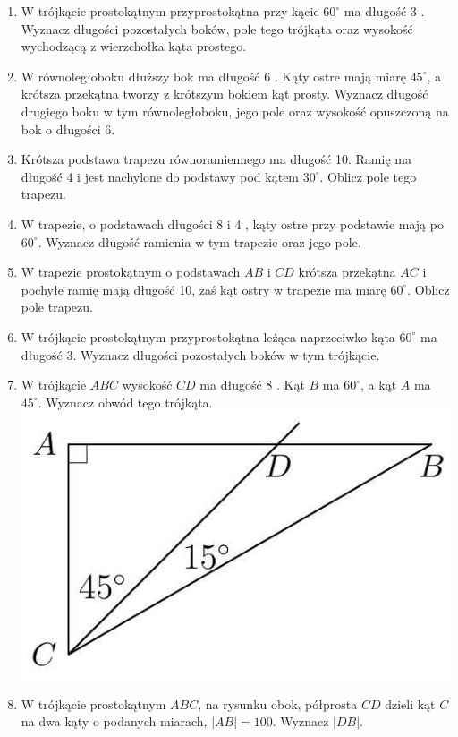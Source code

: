 \documentclass[10pt]{article}
\begin{document}
\begin{enumerate}
  \item W trójkącie prostokątnym przyprostokątna przy kącie \(60^{\circ}\) ma długość 3 . Wyznacz długości pozostałych boków, pole tego trójkąta oraz wysokość wychodzącą z wierzchołka kąta prostego.
  \item W równoległoboku dłuższy bok ma długość 6 . Kąty ostre mają miarę \(45^{\circ}\), a krótsza przekątna tworzy z krótszym bokiem kąt prosty. Wyznacz długość drugiego boku w tym równoległoboku, jego pole oraz wysokość opuszczoną na bok o długości 6.
  \item Krótsza podstawa trapezu równoramiennego ma długość 10. Ramię ma długość 4 i jest nachylone do podstawy pod kątem \(30^{\circ}\). Oblicz pole tego trapezu.
  \item W trapezie, o podstawach długości 8 i 4 , kąty ostre przy podstawie mają po \(60^{\circ}\). Wyznacz długość ramienia w tym trapezie oraz jego pole.
  \item W trapezie prostokątnym o podstawach \(A B\) i \(C D\) krótsza przekątna \(A C\) i pochyłe ramię mają długość 10, zaś kąt ostry w trapezie ma miarę \(60^{\circ}\). Oblicz pole trapezu.
  \item W trójkącie prostokątnym przyprostokątna leżąca naprzeciwko kąta \(60^{\circ}\) ma długość 3. Wyznacz długości pozostałych boków w tym trójkącie.
  \item W trójkącie \(A B C\) wysokość \(C D\) ma długość 8 . Kąt \(B\) ma \(60^{\circ}\), a kąt \(A\) ma \(45^{\circ}\). Wyznacz obwód tego trójkąta.\\
\includegraphics[max width=\textwidth, center]{2024_11_21_71f62bd117d375398909g-137(1)}
  \item W trójkącie prostokątnym \(A B C\), na rysunku obok, półprosta \(C D\) dzieli kąt \(C\) na dwa kąty o podanych miarach, \(|A B|=100\). Wyznacz \(|D B|\).

\end{enumerate}
\end{document}
